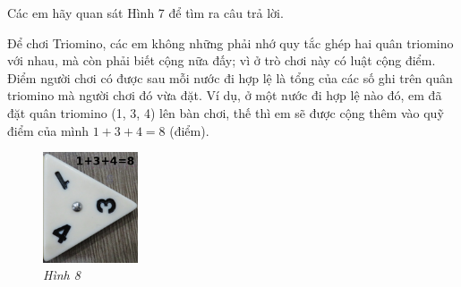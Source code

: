 	\vskip 0.1cm
	Các em hãy quan sát Hình 7 để tìm ra câu trả lời.
	\begin{multicols}{2}
	Để chơi Triomino, các em không những phải nhớ quy tắc ghép hai quân triomino với nhau, mà còn phải biết cộng nữa đấy; vì ở trò chơi này có luật cộng điểm. Điểm người chơi có được sau mỗi nước đi hợp lệ là tổng của các số ghi trên quân triomino mà người chơi đó vừa đặt. Ví dụ, ở một nước đi hợp lệ nào đó, em đã đặt quân triomino (1, 3, 4) lên bàn chơi, thế thì em sẽ được cộng thêm vào quỹ điểm của mình
	\vskip0.1cm
	$1+3+4=8$ (điểm).
	\vskip 0.1cm
	\begin{figure}[H]
		\vspace*{-5pt}
		\centering
		\captionsetup{labelformat=empty, justification=centering}
		\includegraphics[width=0.25\textwidth]{h6-fix}
		\caption{\textit{\small Hình 8}}
		\vspace*{-5pt}
	\end{figure}
	\end{multicols}
